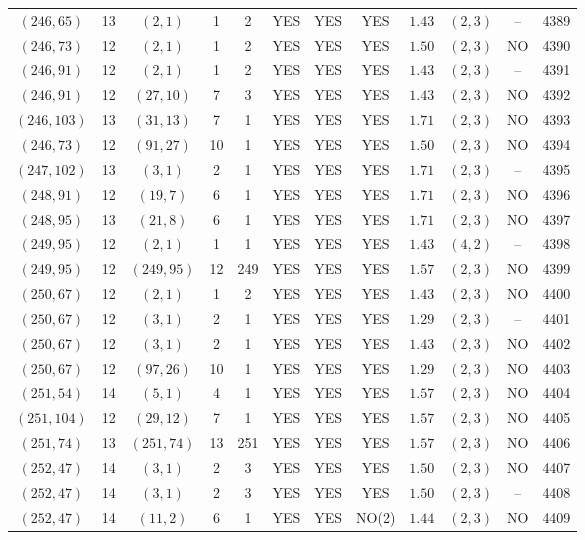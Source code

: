 \begin{longtable}{|c|c|c|c|c|c|c|c|c|c|c|c|}
$(246,65)$ & 13 & $(2,1)$ & 1 & 2 & YES & YES & YES & $1.43$ & $(2,3)$ & -- & 4389\\
$(246,73)$ & 12 & $(2,1)$ & 1 & 2 & YES & YES & YES & $1.50$ & $(2,3)$ & NO & 4390\\
$(246,91)$ & 12 & $(2,1)$ & 1 & 2 & YES & YES & YES & $1.43$ & $(2,3)$ & -- & 4391\\
$(246,91)$ & 12 & $(27,10)$ & 7 & 3 & YES & YES & YES & $1.43$ & $(2,3)$ & NO & 4392\\
$(246,103)$ & 13 & $(31,13)$ & 7 & 1 & YES & YES & YES & $1.71$ & $(2,3)$ & NO & 4393\\
$(246,73)$ & 12 & $(91,27)$ & 10 & 1 & YES & YES & YES & $1.50$ & $(2,3)$ & NO & 4394\\
$(247,102)$ & 13 & $(3,1)$ & 2 & 1 & YES & YES & YES & $1.71$ & $(2,3)$ & -- & 4395\\
$(248,91)$ & 12 & $(19,7)$ & 6 & 1 & YES & YES & YES & $1.71$ & $(2,3)$ & NO & 4396\\
$(248,95)$ & 13 & $(21,8)$ & 6 & 1 & YES & YES & YES & $1.71$ & $(2,3)$ & NO & 4397\\
$(249,95)$ & 12 & $(2,1)$ & 1 & 1 & YES & YES & YES & $1.43$ & $(4,2)$ & -- & 4398\\
$(249,95)$ & 12 & $(249,95)$ & 12 & 249 & YES & YES & YES & $1.57$ & $(2,3)$ & NO & 4399\\
$(250,67)$ & 12 & $(2,1)$ & 1 & 2 & YES & YES & YES & $1.43$ & $(2,3)$ & NO & 4400\\
$(250,67)$ & 12 & $(3,1)$ & 2 & 1 & YES & YES & YES & $1.29$ & $(2,3)$ & -- & 4401\\
$(250,67)$ & 12 & $(3,1)$ & 2 & 1 & YES & YES & YES & $1.43$ & $(2,3)$ & NO & 4402\\
$(250,67)$ & 12 & $(97,26)$ & 10 & 1 & YES & YES & YES & $1.29$ & $(2,3)$ & NO & 4403\\
$(251,54)$ & 14 & $(5,1)$ & 4 & 1 & YES & YES & YES & $1.57$ & $(2,3)$ & NO & 4404\\
$(251,104)$ & 12 & $(29,12)$ & 7 & 1 & YES & YES & YES & $1.57$ & $(2,3)$ & NO & 4405\\
$(251,74)$ & 13 & $(251,74)$ & 13 & 251 & YES & YES & YES & $1.57$ & $(2,3)$ & NO & 4406\\
$(252,47)$ & 14 & $(3,1)$ & 2 & 3 & YES & YES & YES & $1.50$ & $(2,3)$ & NO & 4407\\
$(252,47)$ & 14 & $(3,1)$ & 2 & 3 & YES & YES & YES & $1.50$ & $(2,3)$ & -- & 4408\\
$(252,47)$ & 14 & $(11,2)$ & 6 & 1 & YES & YES & NO(2) & $1.44$ & $(2,3)$ & NO & 4409\\

\end{longtable}
